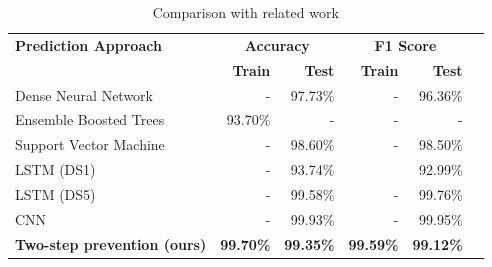 \begin{table}[!htp]\centering
\caption{Comparison with related work}\label{tab:comparison-with-related-works }
\scriptsize
\begin{tabular}{lrrrrr}\toprule
\multirow{}{}{\textbf{Prediction Approach}} &\multicolumn{2}{c}{\textbf{Accuracy}} &\multicolumn{2}{c}{\textbf{F1 Score}} \\\cmidrule{2-5}
&\textbf{Train} &\textbf{Test} &\textbf{Train} &\textbf{Test} \\\midrule
Dense Neural Network \cite{SQLiDataset} &- &97.73\% &- &96.36\% \\
Ensemble Boosted Trees \cite{8959617} &93.70\% &- &- &- \\
Support Vector Machine \cite{7987433} &- &98.60\% &- &98.50\% \\
LSTM (DS1) \cite{8877739} &- &93.74\% & &92.99\% \\
LSTM (DS5) \cite{8877739} &- &99.58\% &- &99.76\% \\
CNN \cite{8616823} &- &99.93\% &- &99.95\% \\
\textbf{Two-step prevention (ours)} & \textbf{99.70\%} & \textbf{99.35\%} & \textbf{99.59\%} & \textbf{99.12\%} \\
\bottomrule
\end{tabular}
\end{table}
